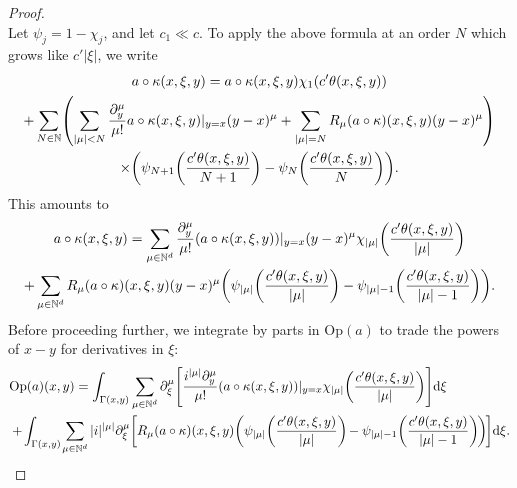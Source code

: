 \documentclass[AHL,Unicode,longabstracts,published]{cedram}
\newcommand{\Opp}{\mathrm{Op}}
\newcommand\1{\mathds{1}}
\newcommand{\N}{\mathbb{N}}
\newcommand{\dd}{\mathrm{d}}
\newcommand*{\Mk}{\mkern -2mu}
\let\originalleft\left
\let\originalright\right
\renewcommand{\left}{\mathopen{}\mathclose\bgroup\originalleft}
\renewcommand{\right}{\aftergroup\egroup\originalright}
\begin{document}
\begin{proof}
\[\]
Let $\psi_j=1-\chi_j$, and let $c_1\ll c$. To apply the above formula at an order $N$ which grows like $c'|\xi|$, we write
\begin{multline*}
a\circ \kappa(x,\xi,y)=a\circ \kappa(x,\xi,y)\chi_1(c'\theta(x,\xi,y))\\+\sum_{N\in
\N}\left(\sum_{|\mu|<N}\frac{\partial^{\mu}_y}{\mu!}a\circ
\kappa(x,\xi,y)|_{y=x}(y-x)^{\mu}+\sum_{|\mu|=N}R_\mu(a\circ
\kappa)(x,\xi,y)(y-x)^{\mu}\right)\\ 
\times \left(\psi_{N+1}\left(\frac{c'\theta(x,\xi,y)}{N+1}\right)-\psi_{N}\left(\frac{c'\theta(x,\xi,y)}{N}\right)\right).
\end{multline*}
This amounts to
\begin{multline*}
a\circ \kappa(x,\xi,y)
=\sum_{\mu\in
\N^d}\frac{\partial_y^{\mu}}{\mu!}(a\circ
\kappa(x,\xi,y))|_{y=x}(y-x)^{\mu}\chi_{|\mu|}\left(\frac{c'\theta(x,\xi,y)}{|\mu|}\right)\\
+\sum_{\mu\in
\N^d}R_{\mu}(a\circ \kappa)(x,\xi,y)(y-x)^{\mu}\left(\psi_{|\mu|}\left(\frac{c'\theta(x,\xi,y)}{|\mu|}\right)-\psi_{|\mu|-1}\left(\frac{c'\theta(x,\xi,y)}{|\mu|-1}\right)\right).
\end{multline*}
Before proceeding further, we integrate by parts in $\Opp(a)$ to trade the powers of $x-y$ for derivatives in $\xi$:
\begin{align*}
&\Opp(a)(x,y)=\int_{\Gamma(x,y)}\sum_{\mu\in
\N^d}\partial_{\xi}^{\mu}\left[\frac{i^{|\mu|}\partial_y^{\mu}}{\mu!}(a\circ
\kappa(x,\xi,y))|_{y=x}\chi_{|\mu|}\left(\frac{c'\theta(x,\xi,y)}{|\mu|}\right)\right]\dd
\xi\\
&+\Mk\int_{\Gamma(x,y)}\Mk\sum_{\mu\in
\N^d}|i|^{|\mu|}\partial_{\xi}^{\mu}\left[R_{\mu}(a\circ
\kappa)(x,\xi,y)\left(\psi_{|\mu|}\left(\frac{c'\theta(x,\xi,y)}{|\mu|}\right)\Mk-\psi_{|\mu|-1}\left(\frac{c'\theta(x,\xi,y)}{|\mu|-1}\right)\Mk\right)\Mk\right]\dd \xi.
\end{align*}


\end{proof}
\end{document}
